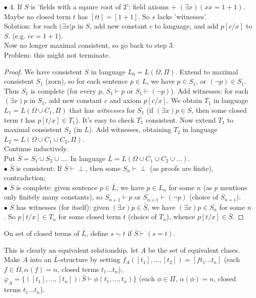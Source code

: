 \documentclass[a4paper]{article}
\begin{document}
\begin{thm}
$\bullet$ 4. If $S$ is 'fields with a sqaure root of $2$': field axioms + $(\exists x) (xx=1+1)$. Maybe no closed term $t$ has $[tt] = [1+1]$. So $s$ lacks 'witnesses'.\\
Solution: for each $(\exists x|p$ in $S$, add new constant $c$ to language, and add $p[c/x]$ to $S$. (e.g. $cc=1+1$).\\
Now no longer maximal consistent, so go back to step 3.\\
Problem: this might not terminate.
\begin{proof}
We have consistent $S$ in language $L_0 = L(\Omega,\Pi)$. Extend to maximal consistent $S_1$ (zorn), so for each sentence $p \in L$, we have $p \in S_1$, or $(\neg p) \in S_1$. Thus $S_1$ is complete (for every $p$, $S_1 \vdash p$ or $S_1 \vdash (\neg p)$). Add witnesses: for each $(\exists x) p$ in $S_1$, add new constant $c$ and axiom $p[c/x]$. We obtain $T_1$ in language $L_1 = L(\Omega \cup C_1,\Pi)$ that has \emph{witnesses} for $S_1$ (if $(\exists x) p \in S$, then some closed term $t$ has $p[t/x] \in T_1$). It's easy to check $T_1$ consistent. Now extend $T_1$ to maximal consistent $S_2$ (in $L$). Add witnesses, obtaining $T_2$ in language $L_2 =L(\Omega \cup C_1 \cup C_2, \Pi)$.\\
Continue inductively.\\
Put $\bar{S} = S_1 \cup S_2 \cup ...$. In language $\bar{L} = L(\Omega \cup C_1\cup C_2 \cup ...)$.\\
$\bullet$ $\bar{S}$ is consistent: If $\bar{S} \vdash \perp$, then some $S_n \vdash \perp$ (as proofs are finite), contradiction;\\
$\bullet$ $\bar{S}$ is complete: given sentence $p \in \bar{L}$, we have $p \in L_n$ for some $n$ (as $p$ mentions only finitely many constants), so $S_{n+1} \vdash p$ or $S_{n+1} \vdash (\neg p)$ (choice of $S_{n+1}$).\\
$\bullet$ $\bar{S}$ has witnesses (for itself): given $(\exists x)p \in \bar{S}$, we have $(\exists x)p \in S_n$ for some $n$. So $p[t/x] \in T_n$ for some closed term $t$ (choice of $T_n$), whence $p[t/x] \in \bar{S}$.
\end{proof}
\end{thm}

On set of closed terms of $\bar{L}$, define $s \sim t$ if $\bar{S} \vdash (s=t)$.

This is clearly an equivalent relationship. let $A$ be the set of equivalent clases. Make $A$ into an $\bar{L}$-structure by setting $f_A([t_1],...,[t_2]) = [ft_1...t_n]$ (each $f \in \bar{\Omega},\alpha(f) = n$, closed terms $t_1...t_n$), $\varphi_A = \{([t_1],...,[t_n]): \bar{S} \vdash \phi(t_1,...,t_n)\}$ (each $\phi \in \Pi$, $\alpha(\phi) = n$, closed terms $t_1...t_n$).
\end{document}
